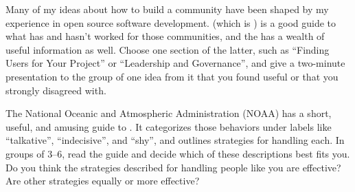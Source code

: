 
Many of my ideas about how to build a community
have been shaped by my experience in open source software development.
\cite{Foge2005} (which is )
is a good guide to what has and hasn't worked for those communities,
and the 
has a wealth of useful information as well.
Choose one section of the latter,
such as ``Finding Users for Your Project''
or ``Leadership and Governance'',
and give a two-minute presentation to the group of one idea from it
that you found useful or that you strongly disagreed with.


The National Oceanic and Atmospheric Administration (NOAA)
has a short, useful, and amusing guide to
.
It categorizes those behaviors under labels like ``talkative'', ``indecisive'', and ``shy'',
and outlines strategies for handling each.
In groups of 3--6,
read the guide and decide which of these descriptions best fits you.
Do you think the strategies described for handling people like you are effective?
Are other strategies equally or more effective?
